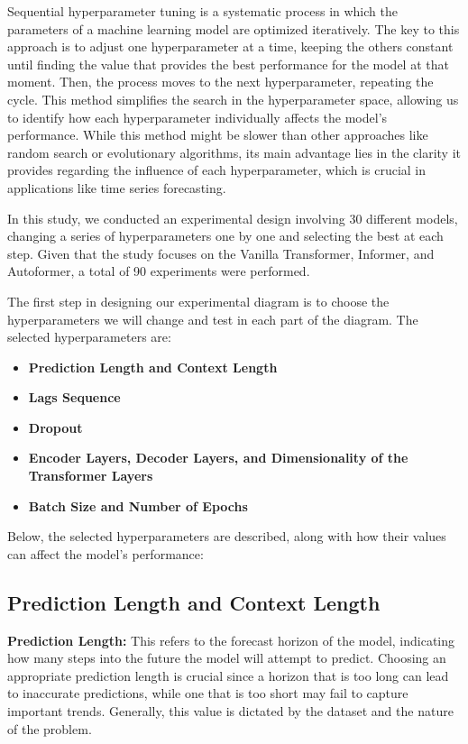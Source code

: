 Sequential hyperparameter tuning is a systematic process in which the parameters of a machine learning model are optimized iteratively. The key to this approach is to adjust one hyperparameter at a time, keeping the others constant until finding the value that provides the best performance for the model at that moment. Then, the process moves to the next hyperparameter, repeating the cycle. This method simplifies the search in the hyperparameter space, allowing us to identify how each hyperparameter individually affects the model's performance. While this method might be slower than other approaches like random search or evolutionary algorithms, its main advantage lies in the clarity it provides regarding the influence of each hyperparameter, which is crucial in applications like time series forecasting.

In this study, we conducted an experimental design involving 30 different models, changing a series of hyperparameters one by one and selecting the best at each step. Given that the study focuses on the Vanilla Transformer, Informer, and Autoformer, a total of 90 experiments were performed.

The first step in designing our experimental diagram is to choose the hyperparameters we will change and test in each part of the diagram. The selected hyperparameters are:

\begin{itemize}
    \item \textbf{Prediction Length and Context Length}
    \item \textbf{Lags Sequence}
    \item \textbf{Dropout}
    \item \textbf{Encoder Layers, Decoder Layers, and Dimensionality of the Transformer Layers}
    \item \textbf{Batch Size and Number of Epochs}
\end{itemize}

Below, the selected hyperparameters are described, along with how their values can affect the model's performance:


\subsection{Prediction Length and Context Length}

\textbf{Prediction Length:} This refers to the forecast horizon of the model, indicating how many steps into the future the model will attempt to predict. Choosing an appropriate prediction length is crucial since a horizon that is too long can lead to inaccurate predictions, while one that is too short may fail to capture important trends. Generally, this value is dictated by the dataset and the nature of the problem.


